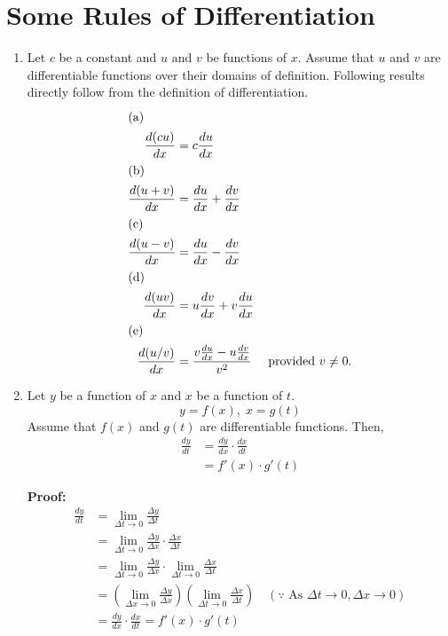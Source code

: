 \section*{Some Rules of Differentiation}
\begin{enumerate}
    \item Let $c$ be a constant and $u$ and $v$ be functions of $x$. Assume that $u$ and $v$ are differentiable functions over their domains of definition. Following results directly follow from the definition of differentiation.
    \begin{align*}
        \intertext{(a) } \frac{d(cu)}{dx} & = c \frac{du}{dx} \\
        \intertext{(b) } \frac{d(u + v)}{dx} & = \frac{du}{dx} + \frac{dv}{dx} \\
        \intertext{(c) } \frac{d(u - v)}{dx} & = \frac{du}{dx} - \frac{dv}{dx} \\
        \intertext{(d) } \frac{d(uv)}{dx} & = u \frac{dv}{dx} + v \frac{du}{dx} \\
        \intertext{(e) } \frac{d(u/v)}{dx} & = \frac{v \frac{du}{dx} - u \frac{dv}{dx}}{v^2} \quad \text{ provided } v \ne 0.
    \end{align*}
    \item Let $y$ be a function of $x$ and $x$ be a function of $t$.
    \[
    y = f(x), \; x = g(t)
    \]
    Assume that $f(x)$ and $g(t)$ are differentiable functions. Then,
    \begin{align*}
        \frac{dy}{dt} & = \frac{dy}{dx} \cdot \frac{dx}{dt} \\
        & = f'(x) \cdot g'(t)
    \end{align*}

    \textbf{Proof:}
    \begin{align*}
        \frac{dy}{dt} & = \lim_{\Delta t \to 0} \frac{\Delta y}{\Delta t} \\
        & = \lim_{\Delta t \to 0} \frac{\Delta y}{\Delta x} \cdot \frac{\Delta x}{\Delta t} \\
        & = \lim_{\Delta t \to 0} \frac{\Delta y}{\Delta x} \cdot \lim_{\Delta t \to 0} \frac{\Delta x}{\Delta t} \\
        & = \left( \lim_{\Delta x \to 0} \frac{ \Delta y}{\Delta x} \right) \left( \lim_{\Delta t \to 0} \frac{ \Delta x}{\Delta t} \right) \quad (\text{$\because$~As } \Delta t \to 0, \Delta x \to 0) \\
        & = \frac{dy}{dx} \cdot \frac{dx}{dt} = f'(x) \cdot g'(t)
    \end{align*}
\end{enumerate}